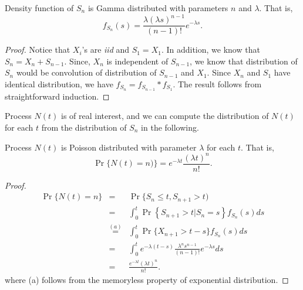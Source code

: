 \documentclass[a4paper,10pt]{article}
\begin{document}
\begin{thm} Density function of $S_n$ is Gamma distributed with parameters $n$ and $\lambda$. That is,
\begin{equation*}
f_{S_n}(s) =\frac{\lambda (\lambda s)^{n-1}} {(n-1)!} e^{-\lambda s}.
\end{equation*}
\end{thm}
\begin{proof} Notice that $X_i$'s are \emph{iid} and $S_1 = X_1$. In addition, we know that $S_n = X_n + S_{n-1}$. Since, $X_n$ is independent of $S_{n-1}$, we know that distribution of $S_n$ would be convolution of distribution of $S_{n-1}$ and $X_1$. Since $X_n$ and $S_1$ have identical distribution, we have $f_{S_{n}}=f_{S_{n-1}}*f_{S_1}$. The result follows from straightforward induction.
\end{proof}

Process $N(t)$ is of real interest, and we can compute the distribution of $N(t)$ for each $t$ from the distribution of $S_n$ in the following.
\begin{thm} Process $N(t)$ is Poisson distributed with parameter $\lambda$ for each $t$. That is,
	\begin{equation*}
	\Pr\{N(t)=n)\}= e^{-\lambda t}\frac{(\lambda t)^{n}}{n!}.
	\end{equation*}
\end{thm}
\begin{proof}

\begin{eqnarray*}
   \Pr\{N(t) =n\}&=&  \Pr\{S_{n}\leqslant t, S_{n+1} >t)\\
   &=&  \int^{t}_{0} \Pr\left\{ {S_{n+1}>t}|{S_{n}=s}\right\}f_{S_n}(s)  ds\\
   &\stackrel{(a)}{=}& \int^{t}_{0} \Pr\{X_{n+1}>t-s\} f_{S_n}(s) ds\\
   &=&  \int^{t}_{0}e^{-\lambda(t- s)} \frac{\lambda^{n}s^{n-1}}{(n-1)!}e^{-\lambda s}  ds\\
   &=&\frac{e^{-\lambda t} (\lambda t)^{n}}{n !}.
\end{eqnarray*}
 where (a) follows from the memoryless property of exponential distribution. %
\end{proof}
\end{document}
